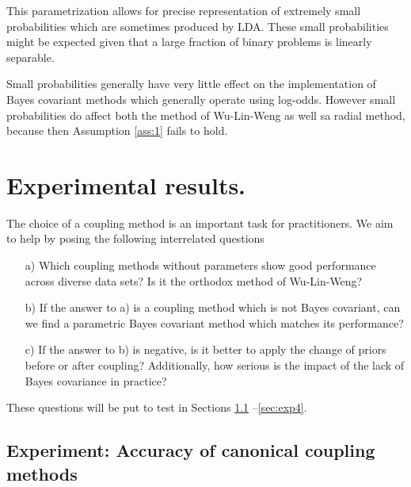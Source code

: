 This parametrization allows for precise representation of extremely small probabilities which are sometimes produced by LDA. These small probabilities might be expected given that a large fraction of binary problems is linearly separable. 

Small probabilities generally have very little effect on the implementation of Bayes covariant methods which generally operate using log-odds. However small probabilities do affect both the method of Wu-Lin-Weng as well sa radial method, because then Assumption \ref{ass:1} fails to hold. 


\section{Experimental results.}

The choice of a coupling method is an important task for practitioners. We aim to help by posing the following interrelated questions 

\begin{itemize}
\item[a)] Which coupling methods without parameters show good performance across diverse data sets? Is it the orthodox method of Wu-Lin-Weng?
\item[b)] If the answer to a) is a coupling method which is not Bayes covariant, can we find a parametric Bayes covariant method which  matches its performance?
\item[c)] If the answer to b) is negative, is it better to apply the change of priors before or after coupling? Additionally, how serious is the impact of the lack of Bayes covariance in practice?
\end{itemize}

These questions will be put to test in Sections \ref{sec:exp1} --\ref{sec:exp4}.



\subsection{Experiment: Accuracy of canonical coupling methods} \label{sec:exp1}

